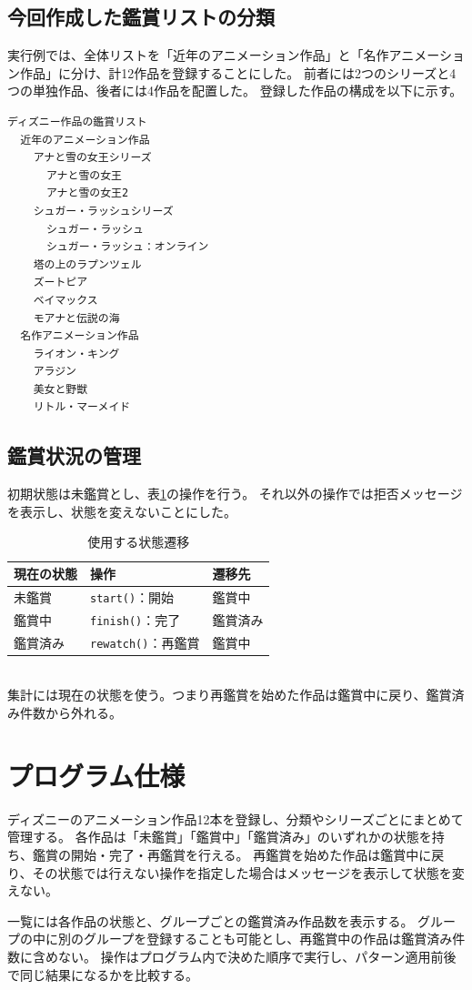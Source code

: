 \documentclass[dvipdfmx,a4paper,11pt]{jsarticle}
\newcommand{\code}[1]{\texttt{#1}}
\begin{document}
\subsection{今回作成した鑑賞リストの分類}
実行例では、全体リストを「近年のアニメーション作品」と「名作アニメーション作品」に分け、計12作品を登録することにした。
前者には2つのシリーズと4つの単独作品、後者には4作品を配置した。
登録した作品の構成を以下に示す。
\begin{Verbatim}
ディズニー作品の鑑賞リスト
  近年のアニメーション作品
    アナと雪の女王シリーズ
      アナと雪の女王
      アナと雪の女王2
    シュガー・ラッシュシリーズ
      シュガー・ラッシュ
      シュガー・ラッシュ：オンライン
    塔の上のラプンツェル
    ズートピア
    ベイマックス
    モアナと伝説の海
  名作アニメーション作品
    ライオン・キング
    アラジン
    美女と野獣
    リトル・マーメイド
\end{Verbatim}
\subsection{鑑賞状況の管理}
初期状態は未鑑賞とし、表\ref{tab:state}の操作を行う。
それ以外の操作では拒否メッセージを表示し、状態を変えないことにした。
\begin{table}[htbp]\centering
\caption{使用する状態遷移}\label{tab:state}
\begin{tabular}{lll}\toprule
現在の状態 & 操作 & 遷移先\\\midrule
未鑑賞 & \code{start()}：開始 & 鑑賞中\\
鑑賞中 & \code{finish()}：完了 & 鑑賞済み\\
鑑賞済み & \code{rewatch()}：再鑑賞 & 鑑賞中\\\bottomrule
\end{tabular}
\end{table}\\
集計には現在の状態を使う。つまり再鑑賞を始めた作品は鑑賞中に戻り、鑑賞済み件数から外れる。

\section{プログラム仕様}
ディズニーのアニメーション作品12本を登録し、分類やシリーズごとにまとめて管理する。
各作品は「未鑑賞」「鑑賞中」「鑑賞済み」のいずれかの状態を持ち、鑑賞の開始・完了・再鑑賞を行える。
再鑑賞を始めた作品は鑑賞中に戻り、その状態では行えない操作を指定した場合はメッセージを表示して状態を変えない。

一覧には各作品の状態と、グループごとの鑑賞済み作品数を表示する。
グループの中に別のグループを登録することも可能とし、再鑑賞中の作品は鑑賞済み件数に含めない。
操作はプログラム内で決めた順序で実行し、パターン適用前後で同じ結果になるかを比較する。
\newpage
\end{document}
